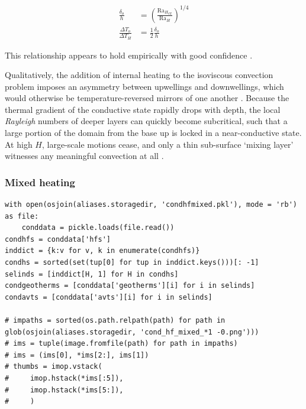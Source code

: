 \begin{align*}
\frac{{\delta}_o}{h} &= {\left( \frac{{{\mathrm{Ra}}_{H}}_{\mathrm{cr}}}{{\mathrm{Ra}}_H} \right)}^{1/4} \\
\frac{{\Delta T}_o}{{\Delta T}_H} &= \frac{1}{2} \frac{{\delta}_o}{h}
\end{align*}

This relationship appears to hold empirically with good confidence \cite{Vilella2017-mg}.

Qualitatively, the addition of internal heating to the isoviscous convection problem imposes an asymmetry between upwellings and downwellings, which would otherwise be temperature-reversed mirrors of one another \cite{Weinstein1990-dd}. Because the thermal gradient of the conductive state rapidly drops with depth, the local \textit{Rayleigh} numbers of deeper layers can quickly become subcritical, such that a large portion of the domain from the base up is locked in a near-conductive state. At high $H$, large-scale motions cease, and only a thin sub-surface `mixing layer' witnesses any meaningful convection at all \cite{Parmentier1994-on}.

\subsubsection{Mixed heating}

\begin{verbatim}
with open(osjoin(aliases.storagedir, 'condhfmixed.pkl'), mode = 'rb') as file:
    conddata = pickle.loads(file.read())
condhfs = conddata['hfs']
inddict = {k:v for v, k in enumerate(condhfs)}
condhs = sorted(set(tup[0] for tup in inddict.keys()))[: -1]
selinds = [inddict[H, 1] for H in condhs]
condgeotherms = [conddata['geotherms'][i] for i in selinds]
condavts = [conddata['avts'][i] for i in selinds]

# impaths = sorted(os.path.relpath(path) for path in glob(osjoin(aliases.storagedir, 'cond_hf_mixed_*1 -0.png')))
# ims = tuple(image.fromfile(path) for path in impaths)
# ims = (ims[0], *ims[2:], ims[1])
# thumbs = imop.vstack(
#     imop.hstack(*ims[:5]),
#     imop.hstack(*ims[5:]),
#     )
\end{verbatim}

